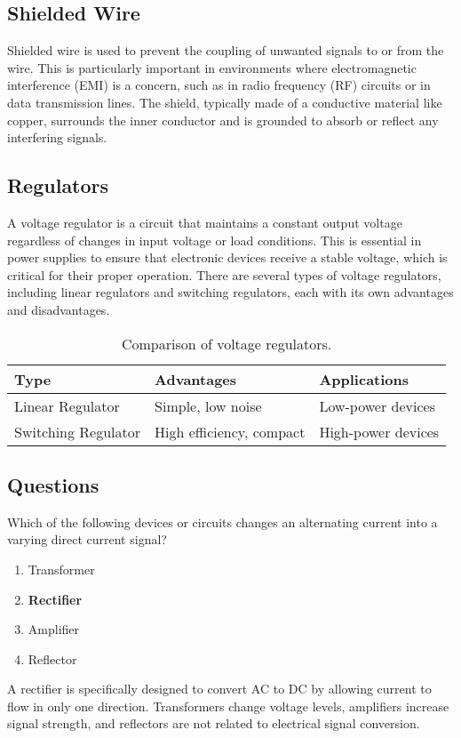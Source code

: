 \subsection*{Shielded Wire}
Shielded wire is used to prevent the coupling of unwanted signals to or from the wire. This is particularly important in environments where electromagnetic interference (EMI) is a concern, such as in radio frequency (RF) circuits or in data transmission lines. The shield, typically made of a conductive material like copper, surrounds the inner conductor and is grounded to absorb or reflect any interfering signals.

\subsection*{Regulators}
A voltage regulator is a circuit that maintains a constant output voltage regardless of changes in input voltage or load conditions. This is essential in power supplies to ensure that electronic devices receive a stable voltage, which is critical for their proper operation. There are several types of voltage regulators, including linear regulators and switching regulators, each with its own advantages and disadvantages.

\begin{table}[h!]
    \centering
    \begin{tabular}{|l|l|l|}
        \hline
        \textbf{Type} & \textbf{Advantages} & \textbf{Applications} \\
        \hline
        Linear Regulator & Simple, low noise & Low-power devices \\
        Switching Regulator & High efficiency, compact & High-power devices \\
        \hline
    \end{tabular}
    \caption{Comparison of voltage regulators.}
    \label{tab:regulators}
\end{table}

\subsection*{Questions}

\begin{tcolorbox}[colback=gray!10!white,colframe=black!75!black,title={T6D01}]
    Which of the following devices or circuits changes an alternating current into a varying direct current signal?
    \begin{enumerate}[label=\Alph*,noitemsep]
        \item Transformer
        \item \textbf{Rectifier}
        \item Amplifier
        \item Reflector
    \end{enumerate}
\end{tcolorbox}
A rectifier is specifically designed to convert AC to DC by allowing current to flow in only one direction. Transformers change voltage levels, amplifiers increase signal strength, and reflectors are not related to electrical signal conversion.

